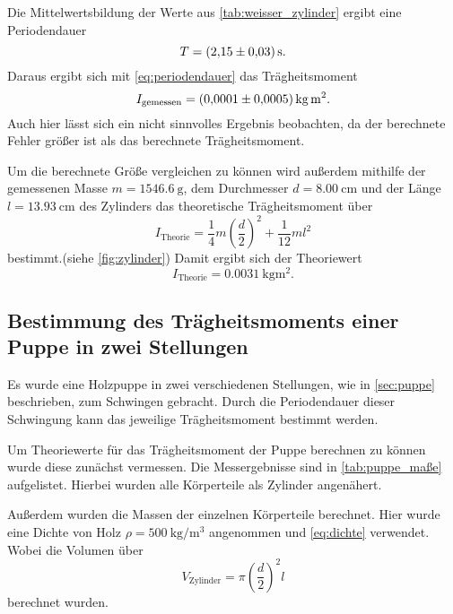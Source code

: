 Die Mittelwertsbildung der Werte aus \autoref{tab:weisser_zylinder} ergibt eine Periodendauer 
\begin{equation}
    T = \SI{2.15+-0.03}{\second}.
\end{equation}
Daraus ergibt sich mit \autoref{eq:periodendauer} das Trägheitsmoment
\begin{equation}
    I_\text{gemessen} = \SI{0.0001+-0.0005}{\kilo\gram\meter\squared}.
\end{equation}
Auch hier lässt sich ein nicht sinnvolles Ergebnis beobachten, da der berechnete Fehler größer ist als das berechnete Trägheitsmoment.

Um die berechnete Größe vergleichen zu können wird außerdem mithilfe der gemessenen Masse $m=\SI{1546.6}{\gram}$, dem Durchmesser $d=\SI{8.00}{\centi\meter}$ und der Länge $l=\SI{13.93}{\centi\meter}$ des Zylinders das theoretische Trägheitsmoment über
\begin{equation}
    I_\text{Theorie} = \frac{1}{4}m\left(\frac{d}{2}\right)^2 + \frac{1}{12}ml^2
\end{equation}
bestimmt.(siehe \autoref{fig:zylinder}) Damit ergibt sich der Theoriewert
\begin{equation}
    I_\text{Theorie} = \SI{0.0031}{\kilo\gram\meter\squared}.
\end{equation}

\subsection{Bestimmung des Trägheitsmoments einer Puppe in zwei Stellungen}
\label{sec:puppe}

Es wurde eine Holzpuppe in zwei verschiedenen Stellungen, wie in \autoref{sec:puppe} beschrieben, zum Schwingen gebracht. 
Durch die Periodendauer dieser Schwingung kann das jeweilige Trägheitsmoment bestimmt werden.

Um Theoriewerte für das Trägheitsmoment der Puppe berechnen zu können wurde diese zunächst vermessen. 
Die Messergebnisse sind in \autoref{tab:puppe_maße} aufgelistet. 
Hierbei wurden alle Körperteile als Zylinder angenähert.

Außerdem wurden die Massen der einzelnen Körperteile berechnet. Hier wurde eine Dichte von Holz $\rho = \SI{500}{\kilo\gram\per\meter\cubed}$ angenommen und \autoref{eq:dichte} verwendet.
Wobei die Volumen über
\begin{equation}
    V_\text{Zylinder} = \pi \left(\frac{d}{2}\right)^2 l 
\end{equation}
berechnet wurden.

